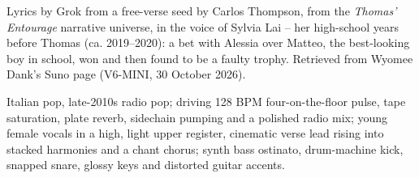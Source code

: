 
\label{sec:il-piu-bello-del-liceo}
\begin{notes}
Lyrics by Grok from a free-verse seed by Carlos Thompson, from the \emph{Thomas' Entourage} narrative universe, in the voice of Sylvia Lai -- her high-school years before Thomas (ca. 2019--2020): a bet with Alessia over Matteo, the best-looking boy in school, won and then found to be a faulty trophy. Retrieved from Wyomee Dank's Suno page (V6-MINI, 30 October 2026).
\end{notes}
\begin{style}
Italian pop, late-2010s radio pop; driving 128 BPM four-on-the-floor pulse, tape saturation, plate reverb, sidechain pumping and a polished radio mix; young female vocals in a high, light upper register, cinematic verse lead rising into stacked harmonies and a chant chorus; synth bass ostinato, drum-machine kick, snapped snare, glossy keys and distorted guitar accents.
\end{style}
